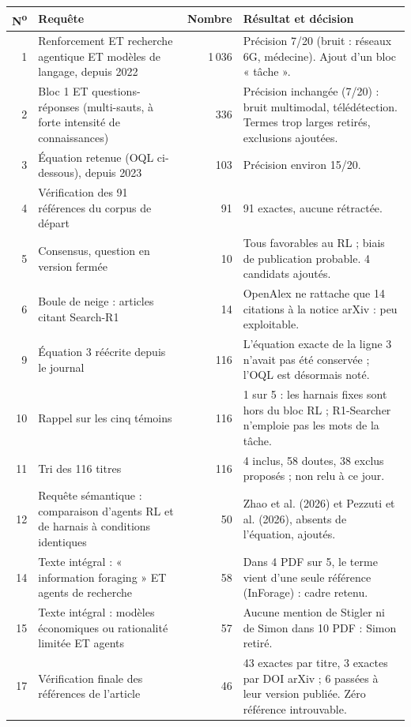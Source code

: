\begin{small}
\begin{longtable}{@{}rp{6.4cm}rp{5.6cm}@{}}
\toprule
N\textsuperscript{o} & Requête & Nombre & Résultat et décision\\
\midrule\endhead
1 & Renforcement ET recherche agentique ET modèles de langage, depuis 2022 & 1\,036 & Précision 7/20 (bruit : réseaux 6G, médecine). Ajout d'un bloc « tâche ».\\
2 & Bloc 1 ET questions-réponses (multi-sauts, à forte intensité de connaissances) & 336 & Précision inchangée (7/20) : bruit multimodal, télédétection. Termes trop larges retirés, exclusions ajoutées.\\
3 & Équation retenue (OQL ci-dessous), depuis 2023 & 103 & Précision environ 15/20.\\
4 & Vérification des 91 références du corpus de départ & 91 & 91 exactes, aucune rétractée.\\
5 & Consensus, question en version fermée & 10 & Tous favorables au RL ; biais de publication probable. 4 candidats ajoutés.\\
6 & Boule de neige : articles citant Search-R1 & 14 & OpenAlex ne rattache que 14 citations à la notice arXiv : peu exploitable.\\
9 & Équation 3 réécrite depuis le journal & 116 & L'équation exacte de la ligne 3 n'avait pas été conservée ; l'OQL est désormais noté.\\
10 & Rappel sur les cinq témoins & 116 & 1 sur 5 : les harnais fixes sont hors du bloc RL ; R1-Searcher n'emploie pas les mots de la tâche.\\
11 & Tri des 116 titres & 116 & 4 inclus, 58 doutes, 38 exclus proposés ; non relu à ce jour.\\
12 & Requête sémantique : comparaison d'agents RL et de harnais à conditions identiques & 50 & Zhao et al. (2026) et Pezzuti et al. (2026), absents de l'équation, ajoutés.\\
14 & Texte intégral : « information foraging » ET agents de recherche & 58 & Dans 4 PDF sur 5, le terme vient d'une seule référence (InForage) : cadre retenu.\\
15 & Texte intégral : modèles économiques ou rationalité limitée ET agents & 57 & Aucune mention de Stigler ni de Simon dans 10 PDF : Simon retiré.\\
17 & Vérification finale des références de l'article & 46 & 43 exactes par titre, 3 exactes par DOI arXiv ; 6 passées à leur version publiée. Zéro référence introuvable.\\

\end{longtable}
\end{small}
